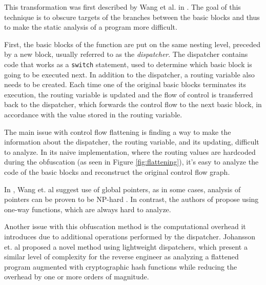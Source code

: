 \documentclass[
  digital, %
  table,   %
  twoside, %
  nolof,     %
  nolot,     %
]{fithesis3}
\theoremstyle{definition}
\begin{document}
This transformation was first described by Wang et al. in \cite{wang2001protection}. The goal of this technique is to obscure targets of the branches between the basic blocks and thus to make the static analysis of a program more difficult. 

First, the basic blocks of the function are put on the same nesting level, preceded by a new block, usually referred to as the \textit{dispatcher}. The dispatcher contains code that works as a \texttt{switch} statement, used to determine which basic block is going to be executed next. In addition to the dispatcher, a routing variable also needs to be created. Each time one of the original basic blocks terminates its execution, the routing variable is updated and the flow of control is transferred back to the dispatcher, which forwards the control flow to the next basic block, in accordance with the value stored in the routing variable. 

The main issue with control flow flattening is finding a way to make the information about the dispatcher, the routing variable, and its updating, difficult to analyze. In its naive implementation, where the routing values are hardcoded during the obfuscation (as seen in Figure \ref{fig:flattening}), it's easy to analyze the code of the basic blocks and reconstruct the original control flow graph. 

In \cite{wang2001protection}, Wang et. al suggest use of global pointers, as in some cases, analysis of pointers can be proven to be NP-hard \cite{np_pointers}. In contrast, the authors of \cite{cappaert2010general} propose using one-way functions, which are always hard to analyze. 

Another issue with this obfuscation method is the computational overhead it introduces due to additional operations performed by the dispatcher. Johansson et. al \cite{johansson2017lightweight} proposed a novel method using lightweight dispatchers, which present a similar level of complexity for the reverse engineer as analyzing a flattened program augmented with cryptographic hash functions while reducing the overhead by one or more orders of magnitude.
\end{document}
